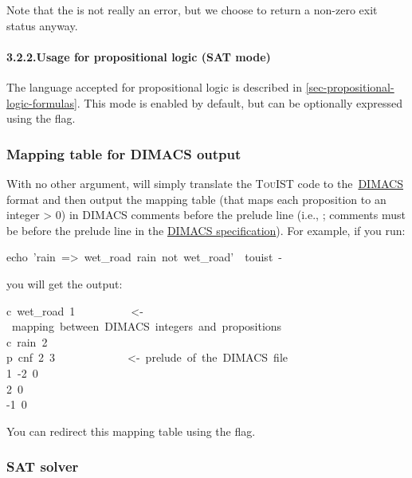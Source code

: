 \noindent Note that the  is not really an error, but we choose to return a
non-zero exit status anyway.%

\paragraph*{3.2.2.\hspace*{0.5em}Usage for propositional logic (SAT mode)}\label{usage-sat}%

\noindent The language accepted for propositional logic is described in
\ref{sec-propositional-logic-formulas}. This mode is enabled by
default, but can be optionally expressed using the  flag.%

\subsubsection{Mapping table for DIMACS output}\label{mapping-table}%

\noindent With no other argument,  will simply translate the {\scshape TouIST} code to
the~\href{http://www.satcompetition.org/2009/format-benchmarks2009.html}{DIMACS} format and then output the mapping table (that maps
each proposition to an integer \textgreater{} 0) in DIMACS comments before the prelude
line (i.e., ; comments must be before the prelude line in the
\href{http://www.satcompetition.org/2009/format-benchmarks2009.html}{DIMACS specification}). For example, if you run:%
\begin{mdpre}%
\noindent{}echo~'rain~=\textgreater{}~wet\_road~rain~not~wet\_road'~\textbar{}~touist~-%
\end{mdpre}\noindent you will get the output:
\begin{mdpre}%
\noindent{}c~wet\_road~1~~~~~~~~~~\textless{}-~mapping~between~DIMACS~integers~and~propositions\\
c~rain~2\\
p~cnf~2~3~~~~~~~~~~~~~\textless{}-~prelude~of~the~DIMACS~file\\
1~-2~0\\
2~0\\
-1~0%
\end{mdpre}\noindent You can redirect this mapping table using the  flag.

\subsubsection{SAT solver}\label{usage-sat-solver}%


